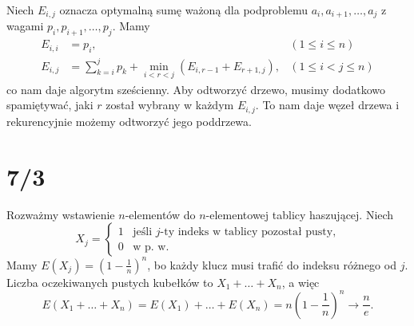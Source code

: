 \documentclass[a4paper, 12pt]{article}
\newcommand{\+}{\enspace}
\begin{document}
Niech $E_{i,j}$ oznacza optymalną sumę ważoną dla podproblemu
$a_i,a_{i+1},…,a_j$ z wagami $p_i,p_{i+1},…,p_j$.
Mamy
\begin{align*}
	E_{i,i} &= p_i, & (1 ≤ i ≤ n)\\
	E_{i,j} &= ∑_{k=i}^j p_k + \min_{i<r<j} (E_{i,r-1}+E_{r+1,j}), & (1 ≤ i < j ≤ n)
\end{align*}
co nam daje algorytm sześcienny.
Aby odtworzyć drzewo, musimy dodatkowo spamiętywać, jaki $r$ został wybrany
w każdym $E_{i,j}$.
To nam daje węzeł drzewa i rekurencyjnie możemy odtworzyć jego poddrzewa.

\section*{7/3}
Rozważmy wstawienie $n$-elementów do $n$-elementowej tablicy haszującej.
Niech
$$X_j =
\begin{cases}
	1 \+ \text{ jeśli $j$-ty indeks w tablicy pozostał pusty,} \\
	0 \+ \text{ w p. w.}
\end{cases}$$
Mamy $E(X_j) = (1- \frac{1}{n})^n$,
bo każdy klucz musi trafić do indeksu różnego od $j$.
Liczba oczekiwanych pustych kubełków to $X_1 + … + X_n$,
a więc
$$E(X_1 + … + X_n)
= E(X_1) + … + E(X_n)
= n\left(1 - \frac{1}{n}\right)^n → \frac{n}{e}.$$
\end{document}
